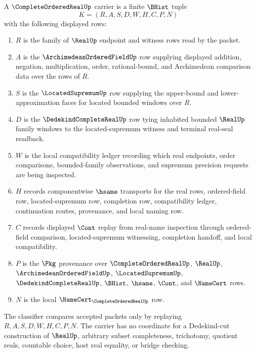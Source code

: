 \begin{definition}
\label{def:complete-ordered-real-carrier}
A $\CompleteOrderedRealUp$ carrier is a finite $\BHist$ tuple
$$
K=(R,A,S,D,W,H,C,P,N)
$$
with the following displayed rows:
\begin{enumerate}
\item $R$ is the family of $\RealUp$ endpoint and witness rows read by the packet.
\item $A$ is the $\ArchimedeanOrderedFieldUp$ row supplying displayed addition, negation, multiplication, order, rational-bound, and Archimedean comparison data over the rows of $R$.
\item $S$ is the $\LocatedSupremumUp$ row supplying the upper-bound and lower-approximation faces for located bounded windows over $R$.
\item $D$ is the $\DedekindCompleteRealUp$ row tying inhabited bounded $\RealUp$ family windows to the located-supremum witness and terminal real-seal readback.
\item $W$ is the local compatibility ledger recording which real endpoints, order comparisons, bounded-family observations, and supremum precision requests are being inspected.
\item $H$ records componentwise $\hsame$ transports for the real rows, ordered-field row, located-supremum row, completion row, compatibility ledger, continuation routes, provenance, and local naming row.
\item $C$ records displayed $\Cont$ replay from real-name inspection through ordered-field comparison, located-supremum witnessing, completion handoff, and local compatibility.
\item $P$ is the $\Pkg$ provenance over $\CompleteOrderedRealUp$, $\RealUp$, $\ArchimedeanOrderedFieldUp$, $\LocatedSupremumUp$, $\DedekindCompleteRealUp$, $\BHist$, $\hsame$, $\Cont$, and $\NameCert$ rows.
\item $N$ is the local $\NameCert_{\CompleteOrderedRealUp}$ row.
\end{enumerate}
The classifier compares accepted packets only by replaying $R,A,S,D,W,H,C,P,N$. The carrier has no coordinate for a Dedekind-cut construction of $\RealUp$, arbitrary subset completeness, trichotomy, quotient reals, countable choice, host real equality, or bridge checking.
\end{definition}

